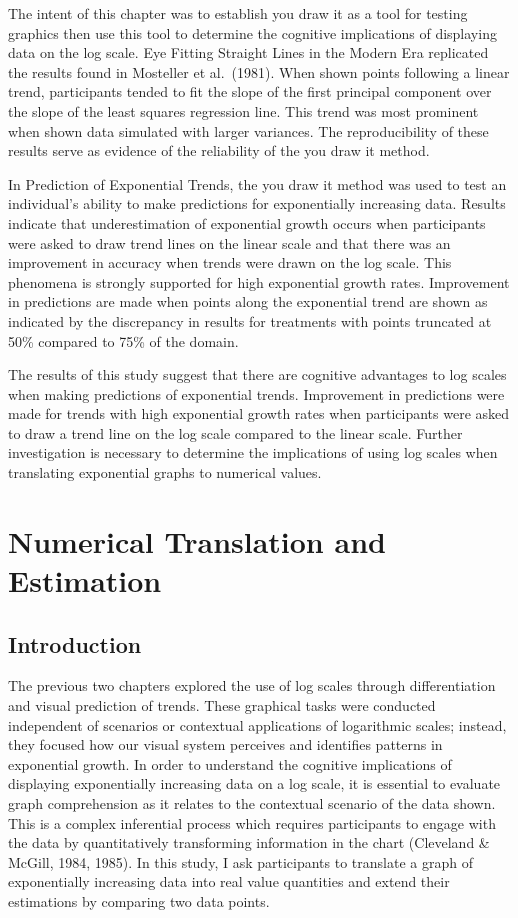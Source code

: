 \documentclass[print]{nuthesis}
\begin{document}
The intent of this chapter was to establish you draw it as a tool for testing graphics then use this tool to determine the cognitive implications of displaying data on the log scale.
Eye Fitting Straight Lines in the Modern Era replicated the results found in Mosteller et al.~(1981).
When shown points following a linear trend, participants tended to fit the slope of the first principal component over the slope of the least squares regression line.
This trend was most prominent when shown data simulated with larger variances.
The reproducibility of these results serve as evidence of the reliability of the you draw it method.

In Prediction of Exponential Trends, the you draw it method was used to test an individual's ability to make predictions for exponentially increasing data.
Results indicate that underestimation of exponential growth occurs when participants were asked to draw trend lines on the linear scale and that there was an improvement in accuracy when trends were drawn on the log scale.
This phenomena is strongly supported for high exponential growth rates.
Improvement in predictions are made when points along the exponential trend are shown as indicated by the discrepancy in results for treatments with points truncated at 50\% compared to 75\% of the domain.

The results of this study suggest that there are cognitive advantages to log scales when making predictions of exponential trends.
Improvement in predictions were made for trends with high exponential growth rates when participants were asked to draw a trend line on the log scale compared to the linear scale.
Further investigation is necessary to determine the implications of using log scales when translating exponential graphs to numerical values.

\hypertarget{estimation}{%
\chapter{Numerical Translation and Estimation}\label{estimation}}

\hypertarget{introduction-2}{%
\section{Introduction}\label{introduction-2}}

The previous two chapters explored the use of log scales through differentiation and visual prediction of trends.
These graphical tasks were conducted independent of scenarios or contextual applications of logarithmic scales; instead, they focused how our visual system perceives and identifies patterns in exponential growth.
In order to understand the cognitive implications of displaying exponentially increasing data on a log scale, it is essential to evaluate graph comprehension as it relates to the contextual scenario of the data shown.
This is a complex inferential process which requires participants to engage with the data by quantitatively transforming information in the chart (Cleveland \& McGill, 1984, 1985).
In this study, I ask participants to translate a graph of exponentially increasing data into real value quantities and extend their estimations by comparing two data points.
\end{document}
